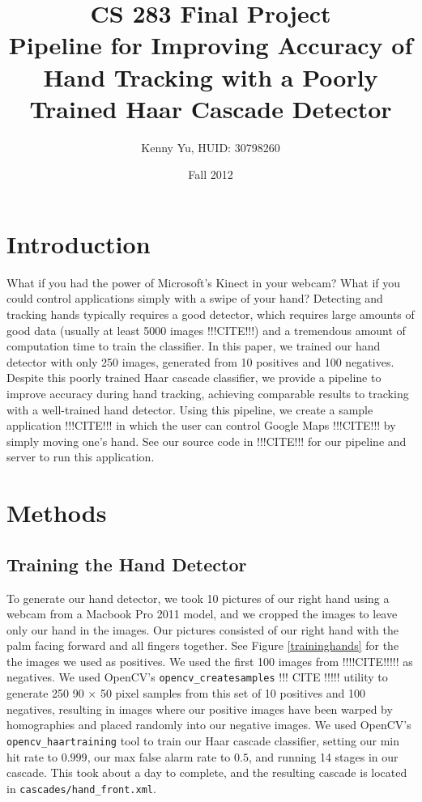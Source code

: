 \documentclass[12pt]{article}
\begin{document}
\title{CS 283 Final Project \\ Pipeline for Improving Accuracy of Hand Tracking with a Poorly Trained Haar Cascade Detector}
\date{Fall 2012}
\author{Kenny Yu, HUID: 30798260}
\maketitle

\section{Introduction}
What if you had the power of Microsoft's Kinect in your webcam? What if you could control applications simply with a swipe of your hand? Detecting and tracking hands typically requires a good detector, which requires large amounts of good data (usually at least 5000 images !!!CITE!!!) and a tremendous amount of computation time to train the classifier. In this paper, we trained our hand detector with only 250 images, generated from 10 positives and 100 negatives. Despite this poorly trained Haar cascade classifier, we provide a pipeline to improve accuracy during hand tracking, achieving comparable results to tracking with a well-trained hand detector. Using this pipeline, we create a sample application !!!CITE!!! in which the user can control Google Maps !!!CITE!!! by simply moving one's hand. See our source code in !!!CITE!!! for our pipeline and server to run this application.

\section{Methods}

\subsection{Training the Hand Detector}
To generate our hand detector, we took 10 pictures of our right hand using a webcam from a  Macbook Pro 2011 model, and we cropped the images to leave only our hand in the images. Our pictures consisted of our right hand with the palm facing forward and all fingers together. See Figure \ref{traininghands} for the the images we used as positives. We used the first 100 images from !!!!CITE!!!!! as negatives. We used OpenCV's \texttt{opencv\_createsamples} !!! CITE !!!!! utility to generate 250 90 $\times$ 50 pixel samples from this set of 10 positives and 100 negatives, resulting in images where our positive images have been warped by homographies and placed randomly into our negative images. We used OpenCV's \texttt{opencv\_haartraining} tool to train our Haar cascade classifier, setting our min hit rate to $0.999$, our max false alarm rate to $0.5$, and running 14 stages in our cascade. This took about a day to complete, and the resulting cascade is located in \texttt{cascades/hand\_front.xml}.
\end{document}
